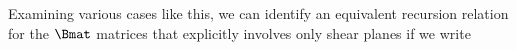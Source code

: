 Examining various cases like this, we can identify an equivalent recursion relation for the $\Bmat$ matrices that explicitly involves only shear planes if we write